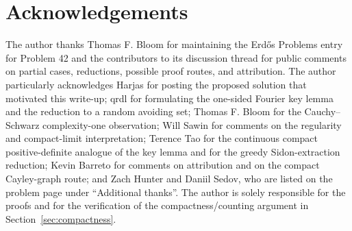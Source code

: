 \documentclass[11pt]{article}
\numberwithin{equation}{section}
\newcommand{\1}{\mathbf 1}
\begin{document}
\section*{Acknowledgements}
The author thanks Thomas F. Bloom for maintaining the Erd\H{o}s Problems
entry for Problem 42 and the contributors to its discussion thread for
public comments on partial cases, reductions, possible proof routes, and
attribution.  The author particularly acknowledges Harjas for posting the
proposed solution that motivated this write-up; qrdl for formulating the
one-sided Fourier key lemma and the reduction to a random avoiding set;
Thomas F. Bloom for the Cauchy--Schwarz complexity-one observation; Will
Sawin for comments on the regularity and compact-limit interpretation;
Terence Tao for the continuous compact positive-definite analogue of the key
lemma and for the greedy Sidon-extraction reduction; Kevin Barreto for
comments on attribution and on the compact Cayley-graph route; and Zach
Hunter and Daniil Sedov, who are listed on the problem page under
``Additional thanks''.  The author is solely responsible for the proofs and
for the verification of the compactness/counting argument in
Section~\ref{sec:compactness}.
\end{document}
